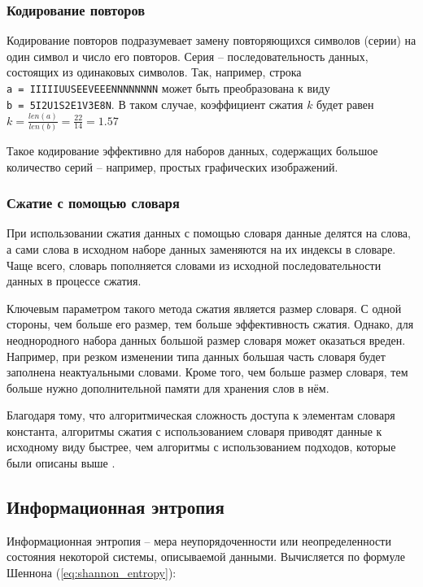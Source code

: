 \subsubsection{Кодирование повторов} 

Кодирование повторов подразумевает замену повторяющихся символов (серии) на один символ и число его повторов. Серия -- последовательность данных, состоящих из одинаковых символов. Так, например, строка \\\texttt{a = IIIIIUUSEEVEEENNNNNNNN} может быть преобразована к виду \\\texttt{b = 5I2U1S2E1V3E8N}. В таком случае, коэффициент сжатия $k$ будет равен $k = \frac{len(a)}{len(b)} = \frac{22}{14} = 1.57$

Такое кодирование эффективно для наборов данных, содержащих большое количество серий -- например, простых графических изображений. 

\subsubsection{Сжатие с помощью словаря}

При использовании сжатия данных с помощью словаря данные делятся на слова, а сами слова в исходном наборе данных заменяются на их индексы в словаре. Чаще всего, словарь пополняется словами из исходной последовательности данных в процессе сжатия. 

Ключевым параметром такого метода сжатия является размер словаря. С одной стороны, чем больше его размер, тем больше эффективность сжатия. Однако, для неоднородного набора данных большой размер словаря может оказаться вреден. Например, при резком изменении типа данных большая часть словаря будет заполнена неактуальными словами. Кроме того, чем больше размер словаря, тем больше нужно дополнительной памяти для хранения слов в нём. 

Благодаря тому, что алгоритмическая сложность доступа к элементам словаря константа, алгоритмы сжатия с использованием словаря приводят данные к исходному виду быстрее, чем алгоритмы с использованием подходов, которые были описаны выше \cite{lossless-compression}.

\subsection{Информационная энтропия}

Информационная энтропия -- мера неупорядоченности или неопределенности состояния некоторой системы, описываемой данными. Вычисляется по формуле Шеннона (\ref{eq:shannon_entropy}):

